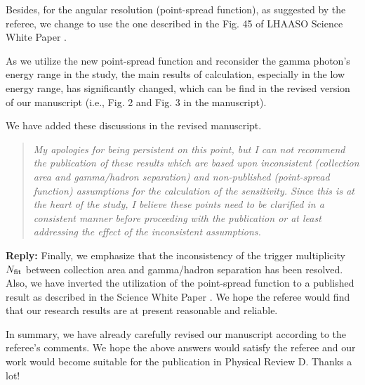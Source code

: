 \documentclass{article}
\begin{document}
Besides, for the angular resolution (point-spread function), as suggested by the referee, we change to use the one described in the Fig. 45 of LHAASO Science White Paper \cite{Bai:2019khm}.


As we utilize the new point-spread function and reconsider the gamma photon's energy range in the study, the main results of calculation, especially in the low energy range, has significantly changed, which can be find in the revised version of our manuscript  (i.e., Fig. 2 and Fig. 3 in the manuscript). 

We have added these discussions in the revised manuscript.
\begin{quote}
\emph{My apologies for being persistent on this point, but I can not recommend the publication of these results which are based upon inconsistent (collection area and gamma/hadron separation) and non-published (point-spread function) assumptions for the calculation of the sensitivity. Since this is at the heart of the study, I believe these points need to be clarified in a consistent manner before proceeding with the publication or at least addressing the effect of the inconsistent assumptions.}
\end{quote}

\textbf{Reply:} Finally, we emphasize that the inconsistency of the trigger multiplicity $N_{\rm fit}$ between collection area and gamma/hadron separation has been resolved. Also, we have inverted the utilization of the point-spread function to a published result as described in the Science White Paper \cite{Bai:2019khm}. We hope the referee would find that our research results are at present reasonable and reliable. 
\vskip 1cm

In summary, we have already carefully revised our manuscript according to the referee's comments. We hope the above answers would satisfy the referee and our work would become suitable for the publication in Physical Review D. Thanks a lot!



\end{document}
